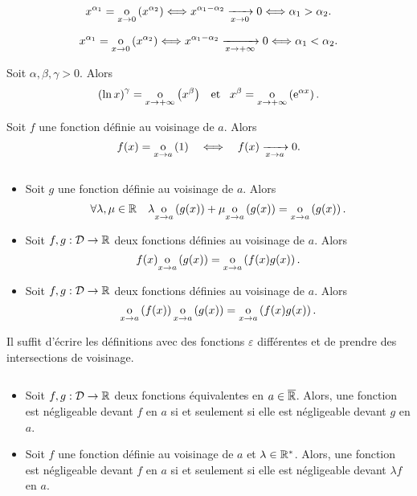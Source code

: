 \documentclass{magnolia}
\begin{document}
\begin{preuve}
$$x^{\alpha_1}=\underset{x \rightarrow 0}{\text{o}}\left(x^{\alpha_2}\right)\Longleftrightarrow x^{\alpha_1-\alpha_2}\xrightarrow[x\rightarrow 0]{}0 \Longleftrightarrow \alpha_1 > \alpha_2.$$

$$x^{\alpha_1}=\underset{x \rightarrow 0}{\text{o}}\left(x^{\alpha_2}\right)\Longleftrightarrow x^{\alpha_1-\alpha_2}\xrightarrow[x\rightarrow +\infty]{}0 \Longleftrightarrow \alpha_1 <\alpha_2.$$
\end{preuve}

\begin{proposition}[utile=-3]
Soit $\alpha,\beta,\gamma>0$. Alors
\[\left(\ln x\right)^\gamma=\underset{x \rightarrow +\infty}{\text{o}}\left(x^\beta\right) \quad\!\text{et}\quad\! x^\beta=\underset{x \rightarrow +\infty}{\text{o}}\left({\rm e}^{\alpha x}\right).\]
\end{proposition}

\begin{proposition}[utile=-3]
Soit $f$ une fonction définie au voisinage de $a$. Alors
\[f(x)=\underset{x \rightarrow a}{\text{o}}\left(1\right) \quad\Longleftrightarrow\quad f(x)\xrightarrow[x\rightarrow a]{}0.\]
\end{proposition}

\begin{proposition}[utile=-3]
$\quad$
\begin{itemize}
\item Soit $g$ une fonction définie au voisinage de $a$. Alors
  \[\forall \lambda,\mu\in\mathbb{R} \quad \lambda\underset{x \rightarrow a}{\text{o}}\left(g(x)\right)+
    \mu\underset{x \rightarrow a}{\text{o}}\left(g(x)\right)=\underset{x \rightarrow a}{\text{o}}\left(g(x)\right).\]
\item Soit $f,g:\mathcal{D}\to\mathbb{R}$ deux fonctions définies au voisinage de $a$. Alors
  \[f(x)\underset{x \rightarrow a}{\text{o}}\left(g(x)\right)=\underset{x \rightarrow a}{\text{o}}\left(f(x)g(x)\right).\]
\item Soit $f,g:\mathcal{D}\to\mathbb{R}$ deux fonctions définies au voisinage de $a$. Alors
  \[\underset{x \rightarrow a}{\text{o}}\left(f(x)\right)\underset{x \rightarrow a}{\text{o}}\left(g(x)\right)=
    \underset{x \rightarrow a}{\text{o}}\left(f(x)g(x)\right).\]
\end{itemize}
\end{proposition}

\begin{preuve}
Il suffit d'écrire les définitions avec des fonctions $\varepsilon$ différentes et de prendre des intersections de voisinage.
\end{preuve}

\begin{proposition}[utile=-3]
$\quad$
\begin{itemize}
\item Soit $f,g:\mathcal{D}\to\mathbb{R}$ deux fonctions équivalentes en $a\in\overline{\mathbb{R}}$. Alors, une
  fonction est négligeable devant $f$ en $a$ si et seulement si elle est
  négligeable devant $g$ en $a$.
\item Soit $f$ une fonction définie au voisinage de $a$ et $\lambda\in{\mathbb{R}^*}$.
  Alors, une fonction est négligeable devant $f$ en $a$ si et seulement si
  elle est négligeable devant $\lambda f$ en $a$.
\end{itemize}
\end{proposition}
\end{document}
